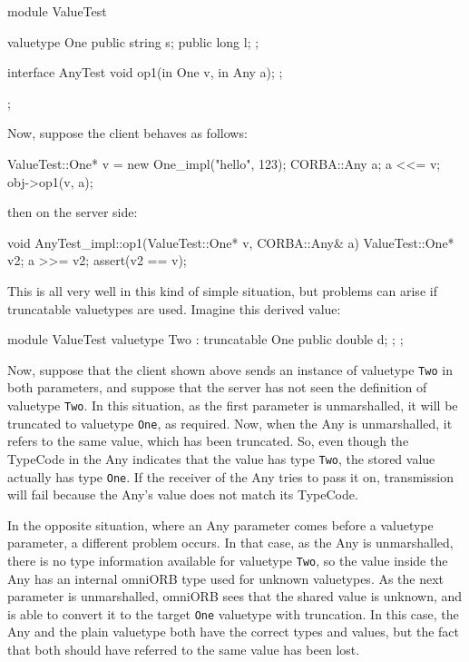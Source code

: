 \documentclass[11pt,twoside,a4paper]{book}
\newcommand{\type}[1]{\texttt{#1}}
\begin{document}
\begin{idllisting}
module ValueTest {
  valuetype One {
    public string s;
    public long   l;
  };

  interface AnyTest {
    void op1(in One v, in Any a);
  };
};
\end{idllisting}

\noindent Now, suppose the client behaves as follows:

\begin{cxxlisting}
ValueTest::One* v = new One_impl("hello", 123);
CORBA::Any a;
a <<= v;
obj->op1(v, a);
\end{cxxlisting}

\noindent then on the server side:

\begin{cxxlisting}
void AnyTest_impl::op1(ValueTest::One* v, CORBA::Any& a)
{
  ValueTest::One* v2;
  a >>= v2;
  assert(v2 == v);
}
\end{cxxlisting}

\noindent
This is all very well in this kind of simple situation, but problems
can arise if truncatable valuetypes are used. Imagine this derived
value:

\begin{idllisting}
module ValueTest {
  valuetype Two : truncatable One {
    public double d;
  };
};
\end{idllisting}

\noindent
Now, suppose that the client shown above sends an instance of
valuetype \type{Two} in both parameters, and suppose that the server
has not seen the definition of valuetype \type{Two}. In this
situation, as the first parameter is unmarshalled, it will be
truncated to valuetype \type{One}, as required. Now, when the Any is
unmarshalled, it refers to the same value, which has been truncated.
So, even though the TypeCode in the Any indicates that the value has
type \type{Two}, the stored value actually has type \type{One}. If the
receiver of the Any tries to pass it on, transmission will fail
because the Any's value does not match its TypeCode.

In the opposite situation, where an Any parameter comes before a
valuetype parameter, a different problem occurs. In that case, as the
Any is unmarshalled, there is no type information available for
valuetype \type{Two}, so the value inside the Any has an internal
omniORB type used for unknown valuetypes. As the next parameter is
unmarshalled, omniORB sees that the shared value is unknown, and is
able to convert it to the target \type{One} valuetype with
truncation. In this case, the Any and the plain valuetype both have
the correct types and values, but the fact that both should have
referred to the same value has been lost.
\end{document}
